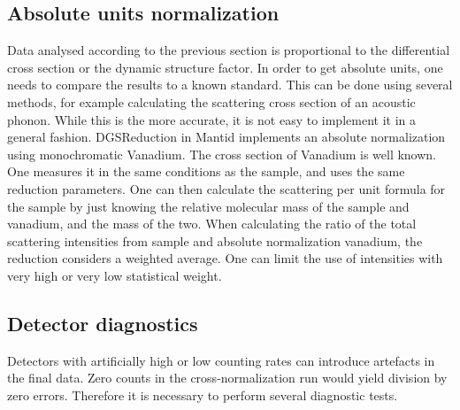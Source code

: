 \subsection{Absolute units normalization}
Data analysed according to the previous section is proportional to the differential cross section or the dynamic structure factor. In order to get absolute units, one needs to compare the results to a known standard. This can be done using several methods, for example calculating the scattering cross section of an acoustic phonon. While this is the more accurate, it is not easy to implement it in a general fashion. DGSReduction in Mantid implements an absolute normalization using monochromatic Vanadium. The cross section of Vanadium is well known. One measures it in the same conditions as the sample, and uses the same reduction parameters. One can then calculate the scattering per unit formula for the sample by just knowing the relative molecular mass of the sample and vanadium, and the mass of the two. When calculating the ratio of the total scattering intensities from sample and absolute normalization vanadium, the reduction considers a weighted average. One can limit the use of intensities with very high or very low statistical weight. 


\subsection{Detector diagnostics}\label{detdiag}
Detectors with artificially high or low counting rates can introduce artefacts in the final data. Zero counts in the cross-normalization run would yield division by zero errors. Therefore it is necessary to perform several diagnostic tests.

